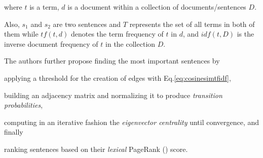where $t$ is a term, $d$ is a document within a collection of documents/sentences $D$.

Also, $s_1$ and $s_2$ are two sentences and $T$ represents the set of all terms in both of them while $tf(t, d)$ denotes the term frequency of $t$ in $d$, and $idf(t, D)$ is the inverse document frequency of $t$ in the collection $D$.

The authors further propose finding the most important sentences by \begin{enumerate*}
    \item applying a threshold for the creation of edges with Eq.\ref{eq:cosinesimtfidf},
    \item building an adjacency matrix and normalizing it to produce \emph{transition probabilities},
    \item computing in an iterative fashion the \emph{eigenvector centrality} until convergence, and finally
    \item ranking sentences based on their \emph{lexical} PageRank (\cite{page1998anatomy}) score.
\end{enumerate*}